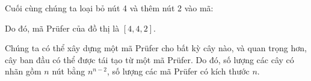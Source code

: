 Cuối cùng chúng ta loại bỏ nút 4 và thêm nút 2 vào mã:
\begin{center}
\end{center}

Do đó, mã Prüfer của đồ thị là $[4,4,2]$.

Chúng ta có thể xây dựng một mã Prüfer cho bất kỳ cây nào,
và quan trọng hơn,
cây ban đầu có thể được tái tạo
từ một mã Prüfer.
Do đó, số lượng các cây có nhãn
gồm $n$ nút bằng
$n^{n-2}$, số lượng các mã Prüfer
có kích thước $n$.
